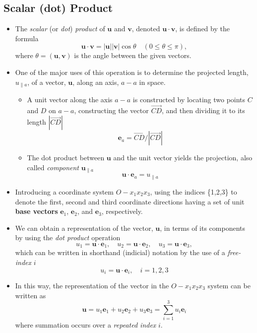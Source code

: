 \documentclass[11pt]{article}
\begin{document}
\subsection*{Scalar (dot) Product}
\label{sec:org3420418}
\begin{itemize}
\item The \emph{scalar} (or \emph{dot}) \emph{product} of \(\boldsymbol{u}\) and \(\boldsymbol{v}\), denoted \(\boldsymbol{u} \cdot \boldsymbol{v}\), is defined by the formula
$$ \boldsymbol{u} \cdot \boldsymbol{v} = |\boldsymbol{u}| |\boldsymbol{v}| \cos\theta \hspace{1em} (0\leq \theta \leq \pi), $$
where \(\theta = (\boldsymbol{u},\boldsymbol{v})\) is the angle between the given vectors.
\item One of the major uses of this operation is to determine the projected length, \(u_{\parallel a}\), of a vector, \(\boldsymbol{u}\), along an axis, \(a-a\) in space.


\begin{itemize}
\item A unit vector along the axis \(a-a\) is constructed by locating two points \(C\) and \(D\) on \(a-a\), constructing the vector \(\vec{CD}\), and then dividing it to its length \(|\vec{CD}|\)
$$ \boldsymbol{e}_a = \vec{CD}/|\vec{CD}| $$

\item The dot product between \(\boldsymbol{u}\) and the unit vector yields the projection, also called \emph{component} \(\boldsymbol{u}_{\parallel a}\)
$$ \boldsymbol{u} \cdot \boldsymbol{e}_a = u_{\parallel a} $$
\end{itemize}
\end{itemize}

\begin{itemize}
\item Introducing a coordinate system \(O-x_1 x_2 x_3\), using the indices \{1,2,3\} to denote the first, second and third coordinate directions having a set of unit \textbf{base vectors} \(\boldsymbol{e}_1\), \(\boldsymbol{e}_2\), and \(\boldsymbol{e}_3\), respectively.
\end{itemize}

\begin{itemize}
\item We can obtain a representation of the vector, \(\boldsymbol{u}\), in terms of its components by using the \emph{dot product} operation
$$ u_1 = \boldsymbol{u}\cdot \boldsymbol{e}_1, \quad u_2 = \boldsymbol{u}\cdot \boldsymbol{e}_2, \quad u_3 = \boldsymbol{u}\cdot \boldsymbol{e}_3, $$
which can be written in shorthand (indicial) notation by the use of a \emph{free-index} \(i\)
$$ u_i = \boldsymbol{u}\cdot \boldsymbol{e}_i, \quad i={1,2,3} $$

\item In this way, the representation of the vector in the \(O-x_1 x_2 x_3\) system can be written as
$$ \boldsymbol{u} = u_1 \boldsymbol{e}_1 + u_2 \boldsymbol{e}_2 + u_3 \boldsymbol{e}_3 = \sum_{i=1}^3 u_i \boldsymbol{e}_i  $$
where summation occurs over a \emph{repeated index} \(i\).
\end{itemize}
\end{document}
